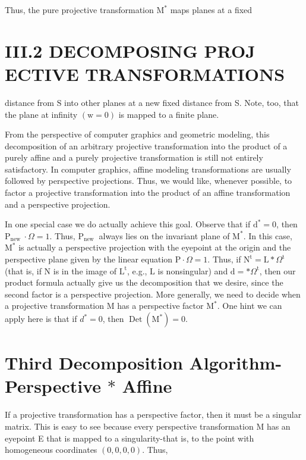 Thus, the pure projective transformation $\mathrm{M}^{*}$ maps planes at a fixed

\section{III.2 DECOMPOSING PROJ ECTIVE TRANSFORMATIONS}
distance from $\mathrm{S}$ into other planes at a new fixed distance from S. Note, too, that the plane at infinity $(\mathrm{w}=0)$ is mapped to a finite plane.

From the perspective of computer graphics and geometric modeling, this decomposition of an arbitrary projective transformation into the product of a purely affine and a purely projective transformation is still not entirely satisfactory. In computer graphics, affine modeling transformations are usually followed by perspective projections. Thus, we would like, whenever possible, to factor a projective transformation into the product of an affine transformation and a perspective projection.

In one special case we do actually achieve this goal. Observe that if $\mathrm{d}^{*}=0$, then $\mathrm{P}_{\text {new }} \cdot \Omega=1$. Thus, $\mathrm{P}_{\text {new }}$ always lies on the invariant plane of $\mathrm{M}^{*}$. In this case, $\mathrm{M}^{*}$ is actually a perspective projection with the eyepoint at the origin and the perspective plane given by the linear equation $\mathrm{P} \cdot \Omega=1$. Thus, if $\mathrm{N}^{\mathrm{t}}=\mathrm{L} * \Omega^{\mathrm{t}}$ (that is, if $\mathrm{N}$ is in the image of $\mathrm{L}^{\mathrm{t}}$, e.g., $\mathrm{L}$ is nonsingular) and $\mathrm{d}=* \Omega^{\mathrm{t}}$, then our product formula actually give us the decomposition that we desire, since the second factor is a perspective projection. More generally, we need to decide when a projective transformation $\mathrm{M}$ has a perspective factor $\mathrm{M}^{*}$. One hint we can apply here is that if $d^{*}=0$, then $\operatorname{Det}\left(\mathrm{M}^{*}\right)=0$.

\section{Third Decomposition Algorithm- Perspective $*$ Affine}
If a projective transformation has a perspective factor, then it must be a singular matrix. This is easy to see because every perspective transformation M has an eyepoint E that is mapped to a singularity-that is, to the point with homogeneous coordinates $(0,0,0,0)$. Thus,

